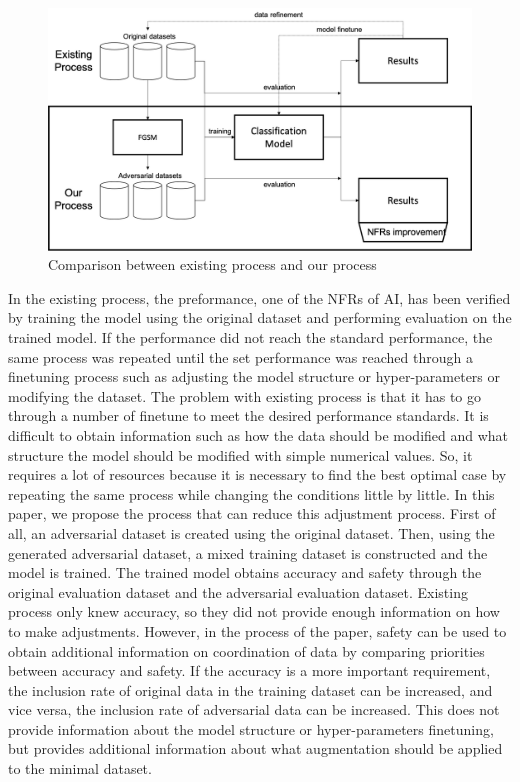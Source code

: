 \documentclass[journal,article,submit,moreauthors,pdftex]{Definitions/mdpi}
\begin{document}
\begin{figure}[H]
    \includegraphics[width=13 cm]{Definitions/comparison.png}
    \caption{Comparison between existing process and our process\label{comparison}}
\end{figure} 

In the existing process, the preformance, one of the NFRs of AI, has been verified by training the model using the original dataset and performing evaluation on the trained model.
If the performance did not reach the standard performance, the same process was repeated until the set performance was reached through a finetuning process such as adjusting the model structure or hyper-parameters or modifying the dataset.
The problem with existing process is that it has to go through a number of finetune to meet the desired performance standards.
It is difficult to obtain information such as how the data should be modified and what structure the model should be modified with simple numerical values.
So, it requires a lot of resources because it is necessary to find the best optimal case by repeating the same process while changing the conditions little by little.
In this paper, we propose the process that can reduce this adjustment process.
First of all, an adversarial dataset is created using the original dataset.
Then, using the generated adversarial dataset, a mixed training dataset is constructed and the model is trained.
The trained model obtains accuracy and safety through the original evaluation dataset and the adversarial evaluation dataset.
Existing process only knew accuracy, so they did not provide enough information on how to make adjustments.
However, in the process of the paper, safety can be used to obtain additional information on coordination of data by comparing priorities between accuracy and safety.
If the accuracy is a more important requirement, the inclusion rate of original data in the training dataset can be increased, and vice versa, the inclusion rate of adversarial data can be increased.
This does not provide information about the model structure or hyper-parameters finetuning, but provides additional information about what augmentation should be applied to the minimal dataset.
\end{document}
